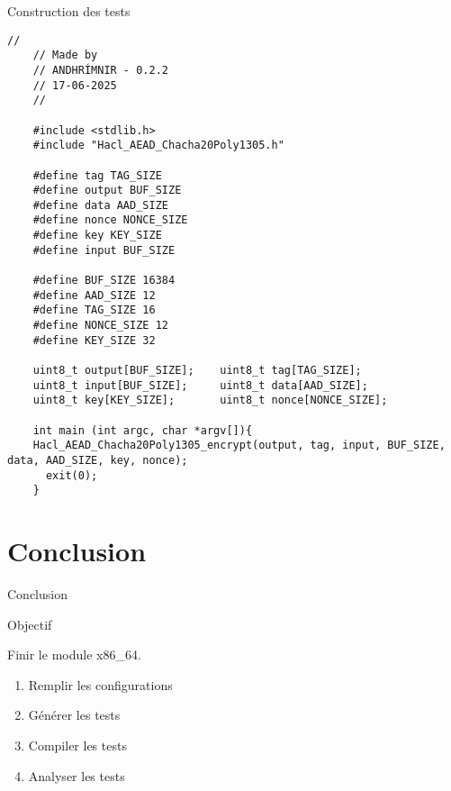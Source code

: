 \documentclass[A4,svgnames,9pt,aspectratio=169]{beamer}
\begin{document}
\begin{frame}[fragile]{Construction des tests}
  \begin{lstlisting}[style=CStyle, gobble=4, caption={Hacl\_AEAD\_Chacha20Poly1305\_Simd128.json}]
    //
    // Made by
    // ANDHRÍMNIR - 0.2.2
    // 17-06-2025
    //

    #include <stdlib.h>
    #include "Hacl_AEAD_Chacha20Poly1305.h"

    #define tag TAG_SIZE
    #define output BUF_SIZE
    #define data AAD_SIZE
    #define nonce NONCE_SIZE
    #define key KEY_SIZE
    #define input BUF_SIZE

    #define BUF_SIZE 16384
    #define AAD_SIZE 12
    #define TAG_SIZE 16
    #define NONCE_SIZE 12
    #define KEY_SIZE 32

    uint8_t output[BUF_SIZE];    uint8_t tag[TAG_SIZE];
    uint8_t input[BUF_SIZE];     uint8_t data[AAD_SIZE];
    uint8_t key[KEY_SIZE];       uint8_t nonce[NONCE_SIZE];

    int main (int argc, char *argv[]){
    Hacl_AEAD_Chacha20Poly1305_encrypt(output, tag, input, BUF_SIZE, data, AAD_SIZE, key, nonce);
      exit(0);
    }
  \end{lstlisting}
\end{frame}

\section{Conclusion}
\frame{\sectionpage}

\begin{frame}{Conclusion}
  \begin{block}{Objectif}
    \begin{center}
      Finir le module x86\_64.
    \end{center}
  \end{block}
\pause
  \begin{enumerate}
    \item Remplir les configurations
    \item Générer les tests
    \item Compiler les tests
    \item Analyser les tests
  \end{enumerate}
  

\end{frame}


\frame{\merci}
\end{document}
